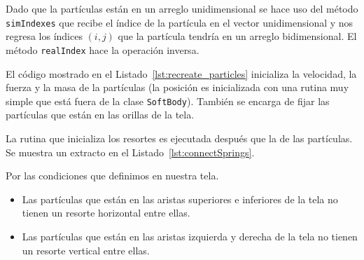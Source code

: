 Dado que la partículas están en un arreglo unidimensional se hace uso del método \texttt{simIndexes} que recibe el índice de la partícula en el vector unidimensional y nos regresa los índices $(i, j)$ que la partícula tendría en un arreglo bidimensional. El método \texttt{realIndex} hace la operación inversa.



El código mostrado en el Listado~\ref{lst:recreate_particles} inicializa la velocidad, la fuerza y la masa de la partículas (la posición es inicializada con una rutina muy simple que está fuera de la clase \texttt{SoftBody}). También se encarga de fijar las partículas que están en las orillas de la tela.

La rutina que inicializa los resortes es ejecutada después que la de las partículas. Se muestra un extracto en el Listado~\ref{lst:connectSprings}.


Por las condiciones que definimos en nuestra tela.
\begin{itemize}
 \item Las partículas que están en las aristas superiores e inferiores de la tela no tienen un resorte horizontal entre ellas.
 \item Las partículas que están en las aristas izquierda y derecha de la tela no tienen un resorte vertical entre ellas.
\end{itemize}

